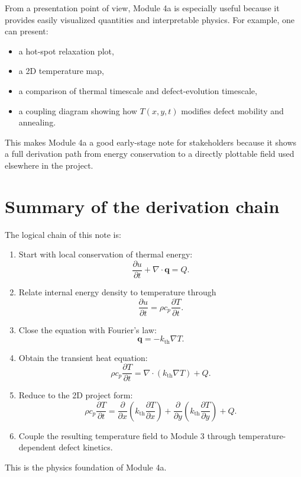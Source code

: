 \documentclass[11pt]{article}
\newcommand{\qvec}{\mathbf{q}}
\newcommand{\kth}{k_{\mathrm{th}}}
\begin{document}
From a presentation point of view, Module 4a is especially useful because it provides easily visualized quantities and interpretable physics. For example, one can present:
\begin{itemize}
    \item a hot-spot relaxation plot,
    \item a 2D temperature map,
    \item a comparison of thermal timescale and defect-evolution timescale,
    \item a coupling diagram showing how $T(x,y,t)$ modifies defect mobility and annealing.
\end{itemize}

This makes Module 4a a good early-stage note for stakeholders because it shows a full derivation path from energy conservation to a directly plottable field used elsewhere in the project.

\section{Summary of the derivation chain}

The logical chain of this note is:
\begin{enumerate}[label=\arabic*.]
    \item Start with local conservation of thermal energy:
    \[
    \frac{\partial u}{\partial t} + \nabla \cdot \qvec = Q.
    \]
    \item Relate internal energy density to temperature through
    \[
    \frac{\partial u}{\partial t} = \rho c_p \frac{\partial T}{\partial t}.
    \]
    \item Close the equation with Fourier's law:
    \[
    \qvec = -\kth \nabla T.
    \]
    \item Obtain the transient heat equation:
    \[
    \rho c_p \frac{\partial T}{\partial t} = \nabla \cdot (\kth \nabla T) + Q.
    \]
    \item Reduce to the 2D project form:
    \[
    \rho c_p \frac{\partial T}{\partial t}
    =
    \frac{\partial}{\partial x}\left(\kth \frac{\partial T}{\partial x}\right)
    +
    \frac{\partial}{\partial y}\left(\kth \frac{\partial T}{\partial y}\right)
    + Q.
    \]
    \item Couple the resulting temperature field to Module 3 through temperature-dependent defect kinetics.
\end{enumerate}

This is the physics foundation of Module 4a.
\end{document}
